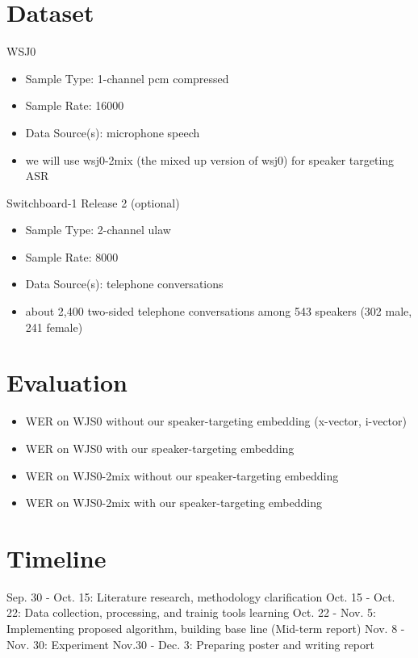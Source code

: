 \documentclass{article}%
\begin{document}
\section{Dataset}
WSJ0
\begin{itemize}
\item Sample Type:	1-channel pcm compressed
\item Sample Rate:	16000
\item Data Source(s):	microphone speech
\item we will use wsj0-2mix (the mixed up version of wsj0) for speaker targeting ASR
\end{itemize}
Switchboard-1 Release 2 (optional)
\begin{itemize}
\item Sample Type:	2-channel ulaw
\item Sample Rate:	8000
\item Data Source(s):	telephone conversations
\item about 2,400 two-sided telephone conversations among 543 speakers (302 male, 241 female)
\end{itemize}

\section{Evaluation}
\begin{itemize}
    \item WER on WJS0 without our speaker-targeting embedding (x-vector, i-vector)
    \item WER on WJS0 with our speaker-targeting embedding
    \item WER on WJS0-2mix without our speaker-targeting embedding
    \item WER on WJS0-2mix with our speaker-targeting embedding
\end{itemize}
\section{Timeline}
Sep. 30 - Oct. 15: Literature research, methodology clarification
Oct. 15 - Oct. 22: Data collection, processing, and trainig tools learning
Oct. 22 - Nov. 5: Implementing proposed algorithm, building base line (Mid-term report)
Nov. 8 - Nov. 30: Experiment 
Nov.30 - Dec. 3: Preparing poster and writing report 


\end{document}
